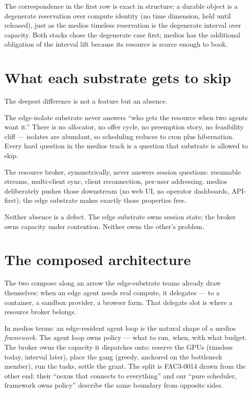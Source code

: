 \documentclass[11pt]{article}
\begin{document}
The correspondence in the first row is exact in structure: a durable object
is a degenerate reservation over compute identity (no time dimension, held
until released), just as the medios timeless reservation is the degenerate
interval over capacity. Both stacks chose the degenerate case first; medios
has the additional obligation of the interval lift because its resource is
scarce enough to book.

\section{What each substrate gets to skip}

The deepest difference is not a feature but an absence.

The edge-isolate substrate never answers ``who gets the resource when two
agents want it.'' There is no allocator, no offer cycle, no preemption
story, no feasibility cliff --- isolates are abundant, so scheduling
reduces to cron plus hibernation. Every hard question in the medios track
is a question that substrate is allowed to skip.

The resource broker, symmetrically, never answers session questions:
resumable streams, multi-client sync, client reconnection, per-user
addressing. medios deliberately pushes those downstream (no web UI, no
operator dashboards, API-first); the edge substrate makes exactly those
properties free.

Neither absence is a defect. The edge substrate owns session state; the
broker owns capacity under contention. Neither owns the other's problem.

\section{The composed architecture}

The two compose along an arrow the edge-substrate teams already draw
themselves: when an edge agent needs real compute, it delegates --- to a
container, a sandbox provider, a browser farm. That delegate slot is where
a resource broker belongs.

In medios terms: an edge-resident agent loop is the natural shape of a
medios \emph{framework}. The agent loop owns policy --- what to run, when,
with what budget. The broker owns the capacity it dispatches onto: reserve
the GPUs (timeless today, interval later), place the gang (greedy, anchored
on the bottleneck member), run the tasks, settle the grant. The split is
FAC3-0014 drawn from the other end: their ``nexus that connects to
everything'' and our ``pure scheduler, framework owns policy'' describe the
same boundary from opposite sides.
\end{document}
